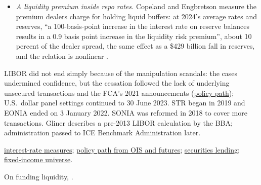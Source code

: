 \begin{qfdefinition}
\begin{itemize}
\item \emph{A liquidity premium inside repo rates.} Copeland and Engbretson measure the premium dealers charge for holding liquid buffers: at 2024's average rates and reserves, ``a 100-basis-point increase in the interest rate on reserve balances results in a 0.9 basis point increase in the liquidity risk premium'', about 10 percent of the dealer spread, the same effect as a \$429 billion fall in reserves, and the relation is nonlinear \citep[Staff Report~1189, March 2026, abstract]{latest-copeland-repo-premium-2026}.
\end{itemize}

 LIBOR did not end simply because of the manipulation scandals: the cases undermined confidence, but the cessation followed the lack of underlying unsecured transactions and the FCA's 2021 announcements (\hyperref[meth:policy-path-ois-futures]{policy path}); U.S.\ dollar panel settings continued to 30 June 2023. \texteuro{}STR began in 2019 and EONIA ended on 3 January 2022. SONIA was reformed in 2018 to cover more transactions. Gliner describes a pre-2013 LIBOR calculation by the BBA; administration passed to ICE Benchmark Administration later.

 \hyperref[def:interest-rate-measures]{interest-rate measures}; \hyperref[meth:policy-path-ois-futures]{policy path from OIS and futures}; \hyperref[mech:securities-lending-short-sale]{securities lending}; \hyperref[def:fixed-income-universe]{fixed-income universe}.

 On funding liquidity, \citep{exp-brunnermeier-pedersen-liquidity}.

\end{qfdefinition}

